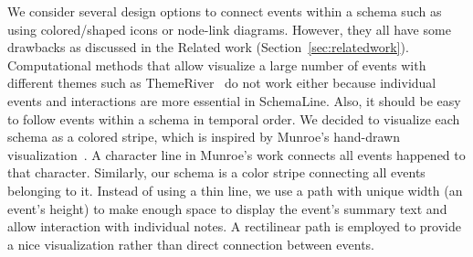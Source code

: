 We consider several design options to connect events within a schema such as using colored/shaped icons or node-link diagrams. However, they all have some drawbacks as discussed in the Related work (Section~\ref{sec:relatedwork}). Computational methods that allow visualize a large number of events with different themes such as ThemeRiver~\cite{Havre2002} do not work either because individual events and interactions are more essential in SchemaLine.  Also, it should be easy to follow events within a schema in temporal order. We decided to visualize each schema as a colored stripe, which is inspired by Munroe's hand-drawn visualization~\cite{Munroe2009}. A character line in Munroe's work connects all events happened to that character. Similarly, our schema is a color stripe connecting all events belonging to it. Instead of using a thin line, we use a path with unique width (an event's height) to make enough space to display the event's summary text and allow interaction with individual notes. A rectilinear path is employed to provide a nice visualization rather than direct connection between events. 




